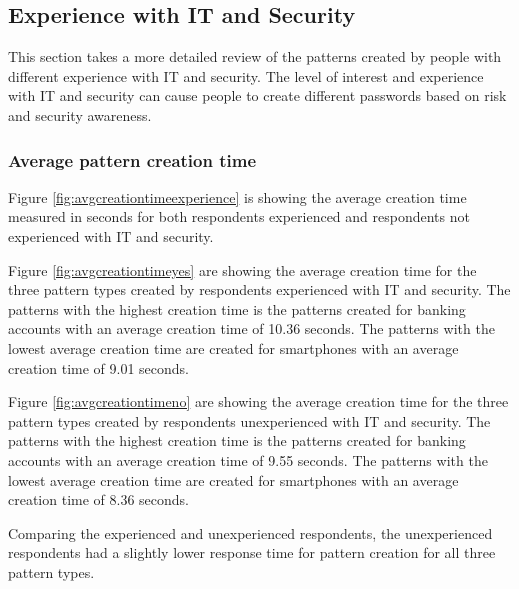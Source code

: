   \clearpage
	\subsection{Experience with IT and Security}


  This section takes a more detailed review of the patterns created by people with different experience with IT and security. The level of interest and experience with IT and security can cause people to create different passwords based on risk and security awareness. 

    \subsubsection{Average pattern creation time}

      Figure \ref{fig:avgcreationtimeexperience} is showing the average creation time measured in seconds for both respondents experienced and respondents not experienced with IT and security. 

      Figure \ref{fig:avgcreationtimeyes} are showing the average creation time for the three pattern types created by respondents experienced with IT and security. The patterns with the highest creation time is the patterns created for banking accounts with an average creation time of 10.36 seconds. The patterns with the lowest average creation time are created for smartphones with an average creation time of 9.01 seconds.

      Figure \ref{fig:avgcreationtimeno} are showing the average creation time for the three pattern types created by respondents unexperienced with IT and security. The patterns with the highest creation time is the patterns created for banking accounts with an average creation time of 9.55 seconds. The patterns with the lowest average creation time are created for smartphones with an average creation time of 8.36 seconds.

      Comparing the experienced and unexperienced respondents, the unexperienced respondents had a slightly lower response time for pattern creation for all three pattern types. 

